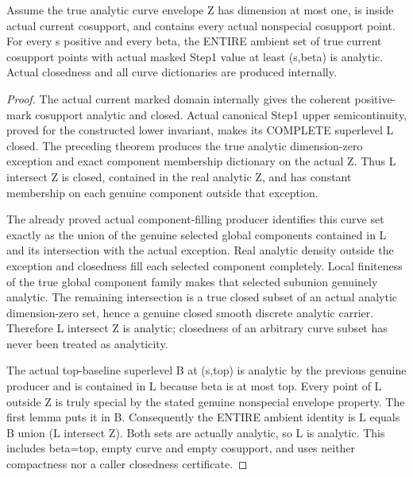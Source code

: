 \begin{theorem}
\label{hir:step-one-positive-entire-ambient-analytic-superlevels}
\leanok
{}
Assume the true analytic curve envelope Z has dimension at most one, is inside
actual current cosupport, and contains every actual nonspecial cosupport point.
For every s positive and every beta, the ENTIRE ambient set of true current
cosupport points with actual masked Step1 value at least (s,beta) is analytic.
Actual closedness and all curve dictionaries are produced internally.
\end{theorem}
\begin{proof}
The actual current marked domain internally gives the coherent positive-mark
cosupport analytic and closed. Actual canonical Step1 upper semicontinuity,
proved for the constructed lower invariant, makes its COMPLETE superlevel
L closed. The preceding theorem produces the true analytic dimension-zero
exception and exact component membership dictionary on the actual Z.
Thus L intersect Z is closed, contained in the real analytic Z, and has
constant membership on each genuine component outside that exception.

The already proved actual component-filling producer identifies this curve
set exactly as the union of the genuine selected global components contained
in L and its intersection with the actual exception. Real analytic density
outside the exception and closedness fill each selected component completely.
Local finiteness of the true global component family makes that selected
subunion genuinely analytic. The remaining intersection is a true closed
subset of an actual analytic dimension-zero set, hence a genuine closed
smooth discrete analytic carrier. Therefore L intersect Z is analytic;
closedness of an arbitrary curve subset has never been treated as analyticity.

The actual top-baseline superlevel B at (s,top) is analytic by the previous
genuine producer and is contained in L because beta is at most top. Every
point of L outside Z is truly special by the stated genuine nonspecial
envelope property. The first lemma puts it in B. Consequently the ENTIRE
ambient identity is L equals B union (L intersect Z). Both sets are actually
analytic, so L is analytic. This includes beta=top, empty curve and empty
cosupport, and uses neither compactness nor a caller closedness certificate.
\end{proof}

